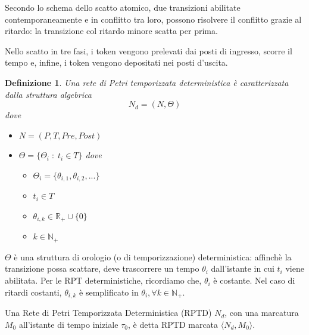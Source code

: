 \documentclass[a4paper]{report}
\newtheorem{definizione}{Definizione}
\begin{document}
Secondo lo schema dello scatto atomico, due transizioni abilitate
contemporaneamente e in conflitto tra loro, possono risolvere il
conflitto grazie al ritardo: la transizione col ritardo minore scatta
per prima.

Nello scatto in tre fasi, i token vengono prelevati dai posti di
ingresso, scorre il tempo e, infine, i token vengono depositati nei
posti d'uscita. 

\begin{definizione}
  Una rete di Petri temporizzata deterministica \`e caratterizzata
  dalla struttura algebrica
  \[
  N_d = (N, \Theta)
  \]
  dove
  \begin{itemize}
  \item $N = (P,T,Pre,Post)$
  \item $\Theta = \{ \Theta_i\; : \; t_i \in T\}$
    dove
    \begin{itemize} 
    \item[*] $\Theta_i = \{\theta_{i,1},\theta_{i,2},... \}$
    \item[*] $t_i \in T$
    \item[*] $\theta_{i,k} \in \mathbb{R_+} \cup \{0\}$
    \item[*] $k \in \mathbb{N_+}$
    \end{itemize}
  \end{itemize}
\end{definizione}
$\Theta$ \`e una struttura di orologio (o di temporizzazione)
deterministica: affinch\`e la transizione possa scattare, deve
trascorrere un tempo $\theta_i$ dall'istante in cui $t_i$ viene
abilitata. Per le RPT deterministiche, ricordiamo che, $\theta_i$ \`e
costante. Nel caso di ritardi costanti, $\theta_{i,k}$ \`e
semplificato in $\theta_i, \forall k \in \mathbb{N_+}$.

Una Rete di Petri Temporizzata Deterministica (RPTD) $N_d$, con una
marcatura $M_0$ all'istante di tempo iniziale $\tau_0$, \`e detta RPTD
marcata $\langle N_d, M_0 \rangle$.
\end{document}
